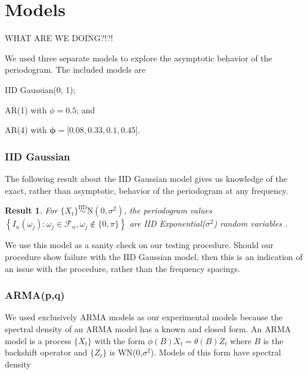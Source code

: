 \documentclass{article}\usepackage{graphicx, color}
\newcommand{\mj}[1]{{\color{blue} #1}}
\theoremstyle{plain}
\newtheorem{res}{Result}
\begin{document}



\section{Models}

\mj{WHAT ARE WE DOING?!?!}

We used three separate models to explore the asymptotic behavior of the periodogram. The included models are \begin{inparaenum}
\item IID Gaussian(0, 1);
\item AR(1) with $\phi = 0.5$; and
\item AR(4) with $\boldsymbol{\phi} = [0.08, 0.33, 0.1, 0.45$].
\end{inparaenum}

\subsubsection*{IID Gaussian}
The following result about the IID Gaussian model gives us knowledge of the exact, rather than asymptotic, behavior of the periodogram at any frequency.

\begin{res}
For $\{X_t\} \stackrel{\text{IID}}{\sim} \text{N}(0,\sigma^2)$, the periodogram values $\left\{ I_n(\omega_j): \omega_j \in \mathcal{F}_n, \omega_j \not\in \{0,\pi\} \right\}$ are IID Exponential($\sigma^2$) random variables \cite{brockwell2002introduction}.
\end{res}

We use this model as a sanity check on our testing procedure. Should our procedure show failure with the IID Gaussian model, then this is an indication of an issue with the procedure, rather than the frequency spacings.

\subsubsection*{ARMA(p,q)}
We used exclusively ARMA models as our experimental models because the spectral density of an ARMA model has a known and closed form. An ARMA model is a process $\{X_t\}$ with the form $\phi(B)X_t = \theta(B)Z_t$ where $B$ is the backshift operator and $\{Z_t\}$ is WN(0,$\sigma^2$). Models of this form have spectral density
\end{document}

